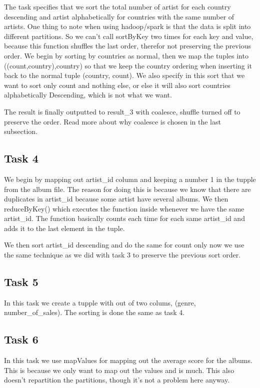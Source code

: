 \documentclass[12pt]{article}
\begin{document}
The task specifies that we sort the total number of artist for each country descending and artist alphabetically for countries with the same number of artists. One thing to note when using hadoop/spark is that the data is split into different partitions. So we can't call sortByKey two times for each key and value, because this function shuffles the last order, therefor not preserving the previous order. We begin by sorting by countries as normal, then we map the tuples into ((count,country),country) so that we keep the country ordering when inserting it back to the normal tuple (country, count). We also specify in this sort that we want to sort only count and nothing else, or else it will also sort countries alphabetically Descending, which is not what we want.

The result is finally outputted to result\_3 with coalesce, shuffle turned off to preserve the order. Read more about why coalesce is chosen in the last subsection. 

\subsection{Task 4}

We begin by mapping out artist\_id column and keeping a number 1 in the tupple from the album file. The reason for doing this is because we know that there are duplicates in artist\_id because some artist have several albums. We then reduceByKey() which executes the function inside whenever we have the same artist\_id. The function basically counts each time for each same artist\_id and adds it to the last element in the tuple. 

We then sort artist\_id descending and do the same for count only now we use the same technique as we did with task 3 to preserve the previous sort order.

\subsection{Task 5}

In this task we create a tupple with out of two colums, (genre, number\_of\_sales). The sorting is done the same as task 4.

\subsection{Task 6}

In this task we use mapValues for mapping out the average score for the albums. This is because we only want to map out the values and is much. This also doesn't repartition the partitions, though it's not a problem here anyway.
\end{document}

